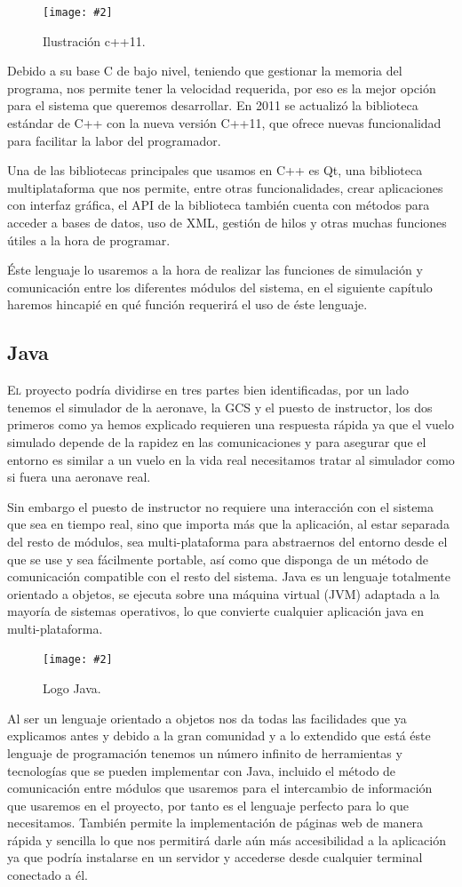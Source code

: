 \documentclass[12pt,a4paper,spanish]{book} %
\newcommand{\imgCentradaMed}[3]{
\begin{figure}[H]
\begin{center}
\texttt{[image: \#2]}
\caption{#3}
\label{#1}
\end{center}
\end{figure}
}
\begin{document}
\imgCentradaMed{fig.2.6}{img/cpp11.eps}{Ilustración c++11.}

Debido a su base C de bajo nivel, teniendo que gestionar la memoria del programa, nos permite tener la velocidad requerida, por eso es la mejor opción para el sistema que queremos desarrollar. En 2011 se actualizó la biblioteca estándar de C++ con la nueva versión C++11, que ofrece nuevas funcionalidad para facilitar la labor del programador.

Una de las bibliotecas principales que usamos en C++ es Qt, una biblioteca multiplataforma que nos permite, entre otras funcionalidades, crear aplicaciones con interfaz gráfica, el API de la biblioteca también cuenta con métodos para acceder a bases de datos, uso de XML, gestión de hilos y otras muchas funciones útiles a la hora de programar.

Éste lenguaje lo usaremos a la hora de realizar las funciones de simulación y comunicación entre los diferentes módulos del sistema, en el siguiente capítulo haremos hincapié en qué función requerirá el uso de éste lenguaje.

\newpage
\subsection{Java}

\lettrine{E}{l} proyecto podría dividirse en tres partes bien identificadas, por un lado tenemos el simulador de la aeronave, la GCS y el puesto de instructor, los dos primeros como ya hemos explicado requieren una respuesta rápida ya que el vuelo simulado depende de la rapidez en las comunicaciones y para asegurar que el entorno es similar a un vuelo en la vida real necesitamos tratar al simulador como si fuera una aeronave real.

Sin embargo el puesto de instructor no requiere una interacción con el sistema que sea en tiempo real, sino que importa más que la aplicación, al estar separada del resto de módulos, sea multi-plataforma para abstraernos del entorno desde el que se use y sea fácilmente portable, así como que disponga de un método de comunicación compatible con el resto del sistema. Java es un lenguaje totalmente orientado a objetos, se ejecuta sobre una máquina virtual (JVM) adaptada a la mayoría de sistemas operativos, lo que convierte cualquier aplicación java en multi-plataforma. 

\imgCentradaMed{fig.2.7}{img/java.eps}{Logo Java.}

Al ser un lenguaje orientado a objetos nos da todas las facilidades que ya explicamos antes y debido a la gran comunidad y a lo extendido que está éste lenguaje de programación tenemos un número infinito de herramientas y tecnologías que se pueden implementar con Java, incluido el método de comunicación entre módulos que usaremos para el intercambio de información que usaremos en el proyecto, por tanto es el lenguaje perfecto para lo que necesitamos. También permite la implementación de páginas web de manera rápida y sencilla lo que nos permitirá darle aún más accesibilidad a la aplicación ya que podría instalarse en un servidor y accederse desde cualquier terminal conectado a él.
\end{document}

